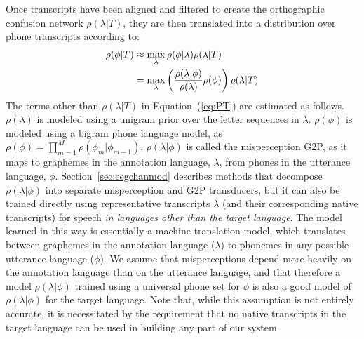 Once transcripts have
been aligned and filtered to create the orthographic confusion network
$\rho(\lambda|T)$, they are then translated into a distribution over
phone transcripts according to:
\begin{align}
  \rho(\phi|T) 
  &\approx \max_{\lambda}  \rho(\phi|\lambda) \rho(\lambda|T) \notag \\
  &= \max_{\lambda}  \left(\frac{\rho(\lambda|\phi)}{\rho(\lambda)}
  \rho(\phi)\right) \rho(\lambda|T) 
\label{eq:PT}
\end{align}
The terms other than $\rho(\lambda|T)$ in Equation~(\ref{eq:PT}) are
estimated as follows.  $\rho(\lambda)$ is modeled using a 
unigram prior over the letter sequences in $\lambda$.
$\rho(\phi)$ is modeled using a bigram phone language model,
as $\rho(\phi)=\prod_{m=1}^M \rho(\phi_m|\phi_{m-1})$.
$\rho(\lambda|\phi)$ is called the misperception G2P, as it maps to
graphemes in the annotation language, $\lambda$, from phones in the
utterance language, $\phi$.  Section~\ref{sec:eegchanmod} describes
methods that decompose $\rho(\lambda|\phi)$ into separate
misperception and G2P transducers, but it can also be trained directly
using
representative transcripts $\lambda$ (and their
corresponding native transcripts) for speech {\em in languages other
  than the target language}.
{\color{blue} The model learned in this way is essentially
  a machine translation model, which translates between graphemes in
  the annotation language ($\lambda$) to phonemes in any possible
  utterance language ($\phi$).}
We assume that misperceptions depend more
heavily on the annotation language than on the utterance language, and
that therefore a model $\rho(\lambda|\phi)$ trained using a universal
phone set for $\phi$ is also a good model of $\rho(\lambda|\phi)$ for
the target language. Note that, while this assumption is not entirely
accurate, it is necessitated by the requirement that no native
transcripts in the target language can be used in building any part
of our system.

